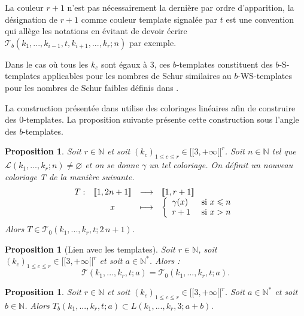 \documentclass{article}
\newtheorem{proposition}[definition]{Proposition}
\begin{document}
La couleur \(r + 1\)  n'est pas nécessairement la dernière par ordre d'apparition, la désignation de \(r+1\) comme couleur template signalée par \(t\) est une convention qui allège les notations en évitant de devoir écrire \(\mathcal{T}_b(k_1, ..., k_{i - 1}, t,  k_{i + 1}, ..., k_r; n)\) par exemple.

Dans le cas où tous les \(k_c\) sont égaux à 3, ces \(b\)-templates constituent des \(b\)-S-templates applicables pour les nombres de Schur similaires au \(b\)-WS-templates pour les nombres de Schur faibles définis dans \cite{schurboyz}.

La construction présentée dans \cite{rowleyramseyabott} utilise des coloriages linéaires afin de construire des \(0\)-templates. La proposition suivante présente cette construction sous l'angle des \(b\)-templates.
\begin{proposition}
Soit \(r \in \mathbb{N}\) et soit \((k_c)_{1 \leqslant c \leqslant r} \in {[\![3, +\infty[\![}^r\). Soit \(n \in \mathbb{N}\) tel que \(\mathcal{L}(k_1, ..., k_r; n) \neq \varnothing\) et on se donne \(\gamma\) un tel coloriage. On définit un nouveau coloriage T de la manière suivante.
\[\begin{array}{c c c l}
	T : & [\![1, 2 n + 1]\!] & \longrightarrow & [\![1, r + 1]\!] \\
	 & x & \longmapsto & \left\{
		\begin{array}{l l}
			\gamma(x) & ~\text{si}~ x \leqslant n \\
			r + 1 & ~\text{si}~ x > n \\
		\end{array}
		\right.
\end{array}\]
Alors \(T \in \mathcal{T}_0(k_1, ..., k_r, t; 2 \, n + 1)\).
\end{proposition}

\begin{proposition}[Lien avec les templates]
Soit \(r \in \mathbb{N}\), soit \((k_c)_{1 \leqslant c \leqslant r} \in {[\![3, +\infty[\![}^r\) et soit \(a \in \mathbb{N}^*\). Alors :
\[ \mathcal{T}(k_1, ..., k_r, t; a) = \mathcal{T}_0(k_1, ..., k_r, t; a). \]
\end{proposition}

\begin{proposition}
Soit \(r \in \mathbb{N}\) et soit \((k_c)_{1 \leqslant c \leqslant r} \in {[\![3, +\infty[\![}^r\). Soit \(a \in \mathbb{N}^*\) et soit \(b \in \mathbb{N}\). Alors  \(T_b(k_1, ..., k_r, t; a) \subset L(k_1, ..., k_r, 3; a + b)\).
\end{proposition}
\end{document}
